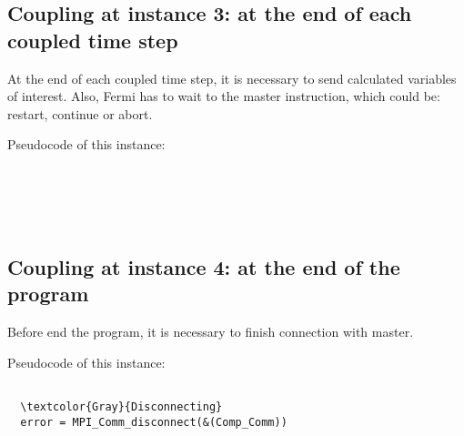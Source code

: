\subsection*{Coupling at instance 3: at the end of each coupled time step}

At the end of each coupled time step, it is necessary to send calculated variables of interest.
Also, Fermi has to wait to the master instruction, which could be: restart, continue or abort.

Pseudocode of this instance:

\begin{Verbatim}[frame=single,commandchars=\\\{\}]





\end{Verbatim}


\subsection*{Coupling at instance 4: at the end of the program}

Before end the program, it is necessary to finish connection with master.

Pseudocode of this instance:

\begin{Verbatim}[frame=single,commandchars=\\\{\}]

  \textcolor{Gray}{Disconnecting}
  error = MPI_Comm_disconnect(&(Comp_Comm))
  
\end{Verbatim}
